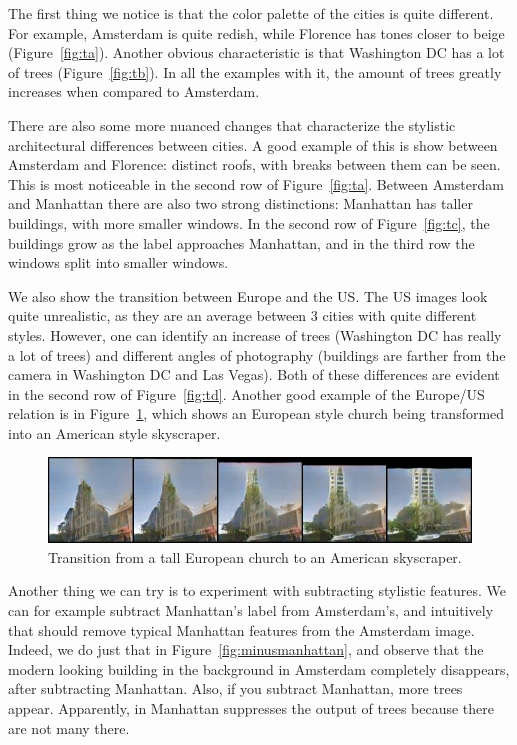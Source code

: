 \documentclass[a4paper]{article}
\begin{document}
The first thing we notice is that the color palette of the cities is quite different.
For example, Amsterdam is quite redish, while Florence has tones closer to beige (Figure~\ref{fig:ta}).
Another obvious characteristic is that Washington DC has a lot of trees (Figure~\ref{fig:tb}).
In all the examples with it, the amount of trees greatly increases when compared to Amsterdam.

There are also some more nuanced changes that characterize the stylistic architectural differences between cities.
A good example of this is show between Amsterdam and Florence: distinct roofs, with breaks between them can be seen.
This is most noticeable in the second row of Figure~\ref{fig:ta}.
Between Amsterdam and Manhattan there are also two strong distinctions: Manhattan has taller buildings, with more smaller windows.
In the second row of Figure~\ref{fig:tc}, the buildings grow as the label approaches Manhattan, and in the third row the windows split into smaller windows.

We also show the transition between Europe and the US.
The US images look quite unrealistic, as they are an average between 3 cities with quite different styles.
However, one can identify an increase of trees (Washington DC has really a lot of trees) and different angles of photography (buildings are farther from the camera in Washington DC and Las Vegas).
Both of these differences are evident in the second row of Figure~\ref{fig:td}.
Another good example of the Europe/US relation is in Figure~\ref{fig:skyscraperchurch}, which shows an European style church being transformed into an American style skyscraper.

\begin{figure}[h]
	\centering
	\includegraphics[width=0.49\linewidth]{figures/europe_us/44}
	\caption{Transition from a tall European church to an American skyscraper.}
	\label{fig:skyscraperchurch}
\end{figure}

Another thing we can try is to experiment with subtracting stylistic features.
We can for example subtract Manhattan's label from Amsterdam's, and intuitively that should remove typical Manhattan features from the Amsterdam image.
Indeed, we do just that in Figure~\ref{fig:minusmanhattan}, and observe that the modern looking building in the background in Amsterdam completely disappears, after subtracting Manhattan. Also, if you subtract Manhattan, more trees appear. Apparently, in Manhattan suppresses the output of trees because there are not many there. 
\end{document}
